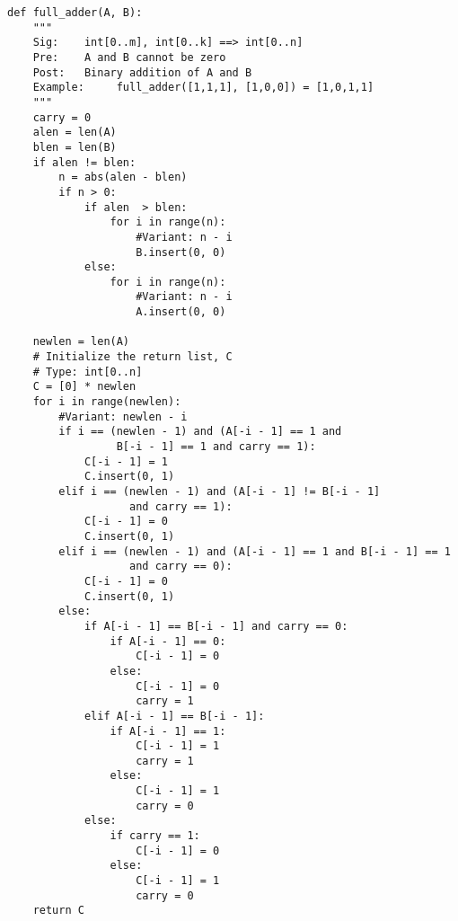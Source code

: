 \documentclass{article}
\begin{document}
\begin{lstlisting}[caption={Code for Binary Adder},captionpos=b]
def full_adder(A, B):
    """
    Sig:    int[0..m], int[0..k] ==> int[0..n]
    Pre:    A and B cannot be zero
    Post:   Binary addition of A and B
    Example:     full_adder([1,1,1], [1,0,0]) = [1,0,1,1]
    """
    carry = 0
    alen = len(A)
    blen = len(B)
    if alen != blen:
        n = abs(alen - blen)
        if n > 0:
            if alen  > blen:
                for i in range(n):
                    #Variant: n - i
                    B.insert(0, 0)
            else:
                for i in range(n):
                    #Variant: n - i
                    A.insert(0, 0)

    newlen = len(A)
    # Initialize the return list, C
    # Type: int[0..n]
    C = [0] * newlen
    for i in range(newlen):
        #Variant: newlen - i
        if i == (newlen - 1) and (A[-i - 1] == 1 and 
        		 B[-i - 1] == 1 and carry == 1):
            C[-i - 1] = 1
            C.insert(0, 1)
        elif i == (newlen - 1) and (A[-i - 1] != B[-i - 1] 
                   and carry == 1):
            C[-i - 1] = 0
            C.insert(0, 1)
        elif i == (newlen - 1) and (A[-i - 1] == 1 and B[-i - 1] == 1 
                   and carry == 0):
            C[-i - 1] = 0
            C.insert(0, 1)
        else:
            if A[-i - 1] == B[-i - 1] and carry == 0:
                if A[-i - 1] == 0:
                    C[-i - 1] = 0
                else:
                    C[-i - 1] = 0
                    carry = 1
            elif A[-i - 1] == B[-i - 1]:
                if A[-i - 1] == 1:
                    C[-i - 1] = 1
                    carry = 1
                else:
                    C[-i - 1] = 1
                    carry = 0
            else:
                if carry == 1:
                    C[-i - 1] = 0
                else:
                    C[-i - 1] = 1
                    carry = 0
    return C
\end{lstlisting}
\newpage
{}
\end{document}

